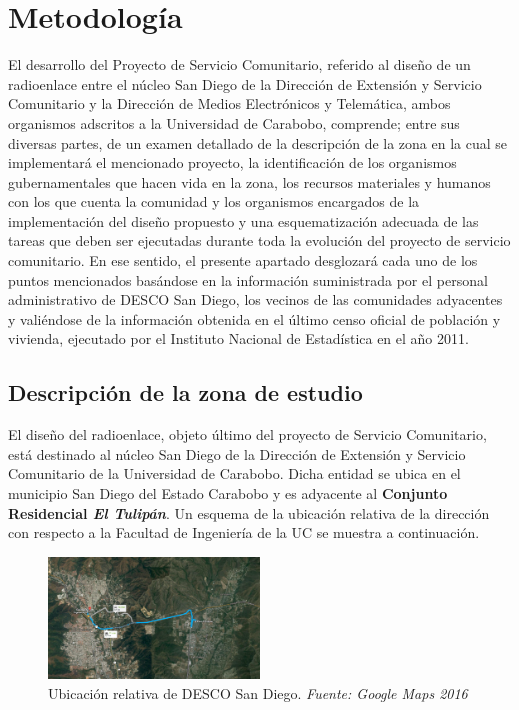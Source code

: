 \documentclass[11pt, a4paper, twosides]{report}
\begin{document}
\chapter{Metodología}
El desarrollo del Proyecto de Servicio Comunitario, referido al diseño de un radioenlace entre el núcleo San Diego de la Dirección de Extensión y Servicio Comunitario y la Dirección de Medios Electrónicos y Telemática, ambos organismos adscritos a la Universidad de Carabobo, comprende; entre sus diversas partes, de un examen detallado de la descripción de la zona en la cual se implementará el mencionado proyecto, la identificación de los organismos gubernamentales que hacen vida en la zona, los recursos materiales y humanos con los que cuenta la comunidad y los organismos encargados de la implementación del diseño propuesto y una esquematización adecuada de las tareas que deben ser ejecutadas durante toda la evolución del proyecto de servicio comunitario. En ese sentido, el presente apartado desglozará cada uno de los puntos mencionados basándose en la información suministrada por el personal administrativo de DESCO San Diego, los vecinos de las comunidades adyacentes y valiéndose de la información  obtenida en el último censo oficial de población y vivienda, ejecutado por el Instituto Nacional de Estadística en el año 2011.

\section{Descripción de la zona de estudio}
El diseño del radioenlace, objeto último del proyecto de Servicio Comunitario, está destinado al núcleo San Diego de la Dirección de Extensión y Servicio Comunitario de la Universidad de Carabobo. Dicha entidad se ubica en el municipio San Diego del Estado Carabobo y es adyacente al \textbf{Conjunto Residencial \textit{El Tulipán}}. Un esquema de la ubicación relativa de la dirección con respecto a la Facultad de Ingeniería de la UC se muestra a continuación.

\begin{figure}[h]
	\centering
	\includegraphics[width=0.5\textwidth]{fig1}
	\caption{Ubicación relativa de DESCO San Diego. \textit{Fuente: Google Maps 2016}}
\end{figure}
\end{document}
